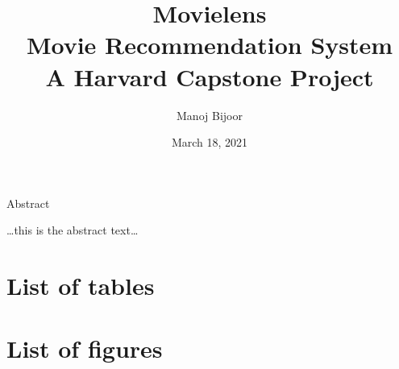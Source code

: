\documentclass[
]{article}
\title{Movielens\\
Movie Recommendation System\\
A Harvard Capstone Project}
\author{Manoj Bijoor}
\date{March 18, 2021}
\begin{document}
\maketitle



\newpage

\newpage

\begin{center}

\hypertarget{Abstract}{}
\large{Abstract}

\end{center}

\bigskip

\ldots this is the abstract text\ldots{}

\newpage 
\clearpage
{}
\setcounter{secnumdepth}{5}
\setcounter{tocdepth}{5}

\cleardoublepage  \hypertarget{toc}{}
\bookmark[dest=toc,level=chapter]{\contentsname} \tableofcontents

\clearpage

\newpage
\clearpage
{}

\hypertarget{list-of-tables}{%
\section*{List of tables}\label{list-of-tables}}

\renewcommand{\listtablename}{}

\listoftables
\clearpage

\newpage
\clearpage
{}

\hypertarget{list-of-figures}{%
\section*{List of figures}\label{list-of-figures}}

\renewcommand{\listfigurename}{}

\listoffigures
\clearpage

\newpage
\clearpage
{}
\newcommand{\listequationsname}{List of Equations}
\newcommand{\equations}[1]{%
\refstepcounter{equations}
\addcontentsline{equ}{equations}{ \protect\numberline{\theequations}#1}\par}
\end{document}
